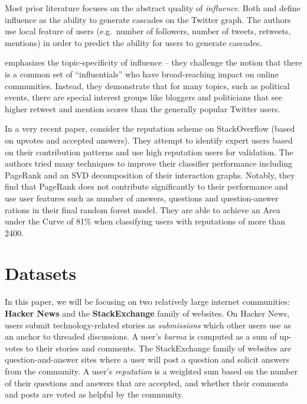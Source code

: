 \documentclass[11pt]{article}
\begin{document}
Most prior literature focuses on the abstract quality of \textit{influence}.
Both \citet{bakshy2011everyone} and \citet{cha2010measuring} define influence as
the ability to generate cascades on the Twitter graph. The authors use local
feature of users (e.g.\ number of followers, number of tweets, retweets,
mentions) in order to predict the ability for users to generate cascades.

\citet{cha2010measuring} emphasizes the topic-specificity of influence -- they
challenge the notion that there is a common set of ``influentials'' who have
broad-reaching impact on online communities. Instead, they demonstrate that for
many topics, such as political events, there are special interest groups like
bloggers and politicians that see higher retweet and mention scores than the
generally popular Twitter users.

In a very recent paper, \citet{movshovitzanalysis} consider the reputation
scheme on StackOverflow (based on upvotes and accepted answers). They attempt to
identify expert users based on their contribution patterns and use high
reputation users for validation. The authors tried many techniques to improve
their classifier performance including PageRank and an SVD decomposition of
their interaction graphs. Notably, they find that PageRank does not contribute
significantly to their performance and use user features such as number of
answers, questions and question-answer rations in their final random forest
model. They are able to achieve an Area under the Curve of 81\% when classifying
users with reputations of more than 2400.

\section{Datasets}

In this paper, we will be focusing on two relatively large internet communities:
\textbf{Hacker News} and the \textbf{StackExchange} family of websites. On
Hacker News, users submit technology-related stories as \textit{submissions}
which other users use as an anchor to threaded discussions.  A user's
\textit{karma} is computed as a sum of up-votes to their stories and comments.
The StackExchange family of websites are question-and-answer sites where a user
will post a question and solicit answers from the community. A user's
\textit{reputation} is a weighted sum based on the number of their questions and
answers that are accepted, and whether their comments and posts are voted as
helpful by the community.
\end{document}
